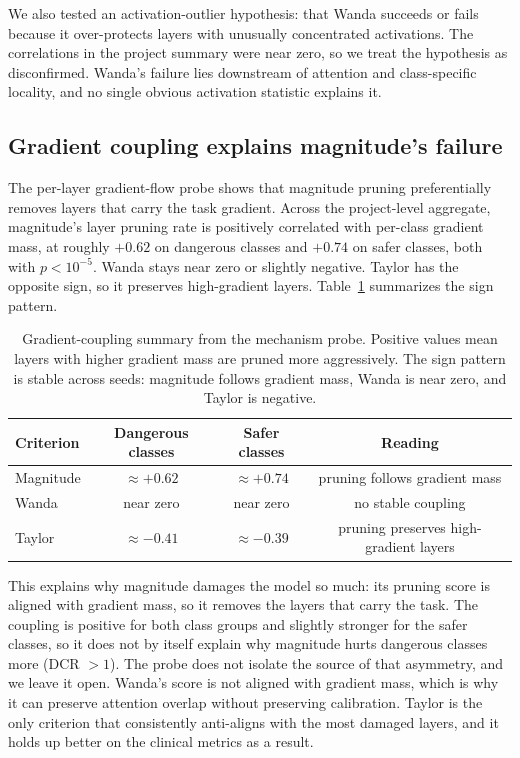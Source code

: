 \documentclass{article}
\newcommand{\DCR}{\ensuremath{\mathrm{DCR}}}
\begin{document}
We also tested an activation-outlier hypothesis: that Wanda succeeds or fails because it over-protects layers with unusually concentrated activations. The correlations in the project summary were near zero, so we treat the hypothesis as disconfirmed. Wanda's failure lies downstream of attention and class-specific locality, and no single obvious activation statistic explains it.

\subsection{Gradient coupling explains magnitude's failure}
The per-layer gradient-flow probe shows that magnitude pruning preferentially removes layers that carry the task gradient. Across the project-level aggregate, magnitude's layer pruning rate is positively correlated with per-class gradient mass, at roughly $+0.62$ on dangerous classes and $+0.74$ on safer classes, both with $p < 10^{-5}$. Wanda stays near zero or slightly negative. Taylor has the opposite sign, so it preserves high-gradient layers. Table~\ref{tab:grad_coupling} summarizes the sign pattern.

\begin{table}[t]
\centering
\small
\caption{Gradient-coupling summary from the mechanism probe. Positive values mean layers with higher gradient mass are pruned more aggressively. The sign pattern is stable across seeds: magnitude follows gradient mass, Wanda is near zero, and Taylor is negative.}
\label{tab:grad_coupling}
\begin{tabular}{lccc}
\toprule
Criterion & Dangerous classes & Safer classes & Reading \\
\midrule
Magnitude & $\approx +0.62$ & $\approx +0.74$ & pruning follows gradient mass \\
Wanda & near zero & near zero & no stable coupling \\
Taylor & $\approx -0.41$ & $\approx -0.39$ & pruning preserves high-gradient layers \\
\bottomrule
\end{tabular}
\end{table}

This explains why magnitude damages the model so much: its pruning score is aligned with gradient mass, so it removes the layers that carry the task. The coupling is positive for both class groups and slightly stronger for the safer classes, so it does not by itself explain why magnitude hurts dangerous classes more (\DCR{} $> 1$). The probe does not isolate the source of that asymmetry, and we leave it open. Wanda's score is not aligned with gradient mass, which is why it can preserve attention overlap without preserving calibration. Taylor is the only criterion that consistently anti-aligns with the most damaged layers, and it holds up better on the clinical metrics as a result.
\end{document}
